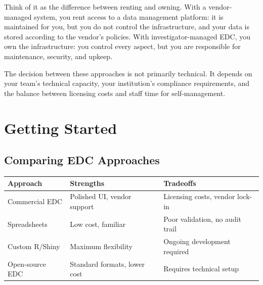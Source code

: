 \documentclass[
  letterpaper,
  DIV=11,
  numbers=noendperiod]{scrartcl}
\newcounter{none} %
\begin{document}
Think of it as the difference between renting and owning. With a
vendor-managed system, you rent access to a data management platform: it
is maintained for you, but you do not control the infrastructure, and
your data is stored according to the vendor's policies. With
investigator-managed EDC, you own the infrastructure: you control every
aspect, but you are responsible for maintenance, security, and upkeep.

The decision between these approaches is not primarily technical. It
depends on your team's technical capacity, your institution's compliance
requirements, and the balance between licensing costs and staff time for
self-management.

\section{Getting Started}\label{getting-started}

\subsection{Comparing EDC Approaches}\label{comparing-edc-approaches}

{\def\LTcaptype{none} %
\begin{longtable}[]{@{}
  >{\raggedright\arraybackslash}p{}
  >{\raggedright\arraybackslash}p{}
  >{\raggedright\arraybackslash}p{}@{}}
\toprule\noalign{}
\begin{minipage}[b]{\linewidth}\raggedright
Approach
\end{minipage} & \begin{minipage}[b]{\linewidth}\raggedright
Strengths
\end{minipage} & \begin{minipage}[b]{\linewidth}\raggedright
Tradeoffs
\end{minipage} \\
\midrule\noalign{}
\endhead
\bottomrule\noalign{}
\endlastfoot
Commercial EDC & Polished UI, vendor support & Licensing costs, vendor
lock-in \\
Spreadsheets & Low cost, familiar & Poor validation, no audit trail \\
Custom R/Shiny & Maximum flexibility & Ongoing development required \\
Open-source EDC & Standard formats, lower cost & Requires technical
setup \\
\end{longtable}
}
\end{document}
